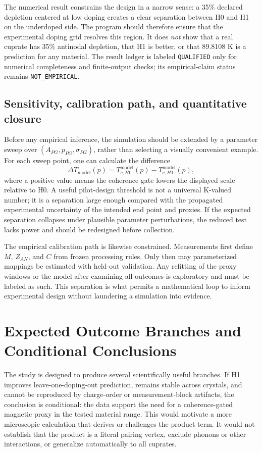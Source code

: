 \documentclass[conference]{IEEEtran}
\begin{document}
The numerical result constrains the design in a narrow sense: a 35\% declared depletion centered at low doping creates a clear separation between H0 and H1 on the underdoped side. The program should therefore ensure that the experimental doping grid resolves this region. It does \emph{not} show that a real cuprate has 35\% antinodal depletion, that H1 is better, or that 89.8108 K is a prediction for any material. The result ledger is labeled \texttt{QUALIFIED} only for numerical completeness and finite-output checks; its empirical-claim status remains \texttt{NOT\_EMPIRICAL}.

\subsection{Sensitivity, calibration path, and quantitative closure}

Before any empirical inference, the simulation should be extended by a parameter sweep over $(A_{PG},p_{PG},\sigma_{PG})$, rather than selecting a visually convenient example. For each sweep point, one can calculate the difference
\begin{equation}
\Delta T_{\mathrm{model}}(p)=T_{c,H0}^{\mathrm{model}}(p)-T_{c,H1}^{\mathrm{model}}(p),
\label{eq:deltat}
\end{equation}
where a positive value means the coherence gate lowers the displayed scale relative to H0. A useful pilot-design threshold is not a universal K-valued number; it is a separation large enough compared with the propagated experimental uncertainty of the intended end point and proxies. If the expected separation collapses under plausible parameter perturbations, the reduced test lacks power and should be redesigned before collection.

The empirical calibration path is likewise constrained. Measurements first define $M$, $Z_{AN}$, and $C$ from frozen processing rules. Only then may parameterized mappings be estimated with held-out validation. Any refitting of the proxy windows or the model after examining all outcomes is exploratory and must be labeled as such. This separation is what permits a mathematical loop to inform experimental design without laundering a simulation into evidence.

\section{Expected Outcome Branches and Conditional Conclusions}

The study is designed to produce several scientifically useful branches. If H1 improves leave-one-doping-out prediction, remains stable across crystals, and cannot be reproduced by charge-order or measurement-block artifacts, the conclusion is conditional: the data support the need for a coherence-gated magnetic proxy in the tested material range. This would motivate a more microscopic calculation that derives or challenges the product term. It would not establish that the product is a literal pairing vertex, exclude phonons or other interactions, or generalize automatically to all cuprates.
\end{document}
